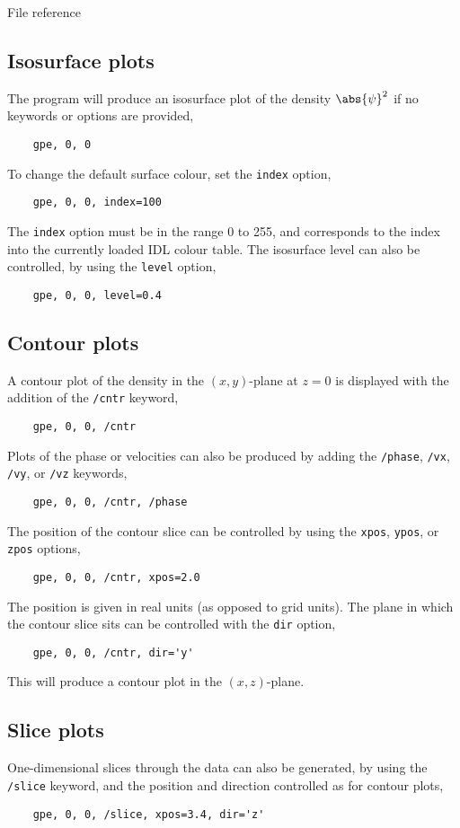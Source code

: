 \begin{chapter}{\label{cha:file_reference}File reference}
  \subsection{Isosurface plots}
  The program will produce an isosurface plot of the density $\abs{\psi}^{2}$
  if no keywords or options are provided, \eg
  \begin{Verbatim}
    gpe, 0, 0
  \end{Verbatim}
  To change the default surface colour, set the \verb"index" option, \eg
  \begin{Verbatim}
    gpe, 0, 0, index=100
  \end{Verbatim}
  The \verb"index" option must be in the range 0 to 255, and corresponds to the
  index into the currently loaded IDL colour table.
  The isosurface level can also be controlled, by using the \verb"level"
  option, \eg
  \begin{Verbatim}
    gpe, 0, 0, level=0.4
  \end{Verbatim}

  \subsection{Contour plots}
  A contour plot of the density in the $(x,y)$-plane at $z=0$ is displayed with
  the addition of the \verb"/cntr" keyword, \eg
  \begin{Verbatim}
    gpe, 0, 0, /cntr
  \end{Verbatim}
  Plots of the phase or velocities can also be produced by adding the
  \verb"/phase", \verb"/vx", \verb"/vy", or \verb"/vz" keywords, \eg
  \begin{Verbatim}
    gpe, 0, 0, /cntr, /phase
  \end{Verbatim}
  The position of the contour slice can be controlled by using the \verb"xpos",
  \verb"ypos", or \verb"zpos" options, \eg
  \begin{Verbatim}
    gpe, 0, 0, /cntr, xpos=2.0
  \end{Verbatim}
  The position is given in real units (as opposed to grid units).
  The plane in which the contour slice sits can be controlled with the
  \verb"dir" option, \eg
  \begin{Verbatim}
    gpe, 0, 0, /cntr, dir='y'
  \end{Verbatim}
  This will produce a contour plot in the $(x,z)$-plane.

  \subsection{Slice plots}
  One-dimensional slices through the data can also be generated, by using the
  \verb"/slice" keyword, and the position and direction controlled as for
  contour plots, \eg
  \begin{Verbatim}
    gpe, 0, 0, /slice, xpos=3.4, dir='z'
  \end{Verbatim}


\end{chapter}

